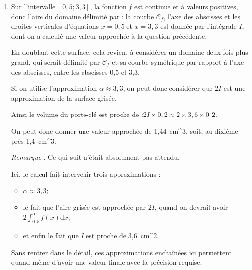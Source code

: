 \documentclass[10pt]{article}
\providecommand{\e}{{\mathrm{e}}}
\providecommand{\np}[2][]{{#2~#1}}
\renewcommand{\d}{{\mathrm{d}}}
\providecommand{\ds}{\displaystyle}
\begin{document}
\begin{enumerate}
		Comme on a :\quad $I= 0,5\e^{2} - 3,3\e^{-3,6}\approx 3,6$\quad au dixième près, on arrive bien à l'arrondi annoncé.

		\item Sur l'intervalle $[0,5 ; 3,3]$, la fonction $f$ est continue et à valeurs positives, donc l'aire du domaine délimité par : la courbe $\mathcal{C}_f$, l'axe des abscisses et les droites verticales d'équations $x = 0,5$ et $x = 3,3$ est donnée par l'intégrale $I$, dont on a calculé une valeur approchée à la question précédente.

		En doublant cette surface, cela revient à considérer un domaine deux fois plus grand, qui serait délimité par $\mathcal{C}_f$ et sa courbe symétrique par rapport à l'axe des abscisses, entre les abscisses 0,5 et 3,3.

		Si on utilise l'approximation $\alpha \approx 3,3$, on peut donc considérer que $2I$ est une approximation de la surface grisée.

		Ainsi le volume du porte-clé est proche de :\quad $2I \times 0,2 \approx 2 \times 3,6 \times 0,2$.

		On peut donc donner une valeur approchée de \np[cm^3]{1,44}, soit, au dixième près \np[cm^3]{1,4}.

		\emph{Remarque :} Ce qui suit n'était absolument pas attendu.

	 Ici, le calcul fait intervenir trois approximations :
	 \begin{itemize}
	 	\item $\alpha \approx 3,3$;
	 	\item le fait que l'aire grisée est approchée par $2I$, quand on devrait avoir \quad $\ds 2\int_{0,5}^{\alpha} f(x) \d x$;
	 	\item et enfin le fait que $I$ est proche de \np[cm^2]{3,6}.
	 \end{itemize}

		Sans rentrer dans le détail, ces approximations enchaînées ici permettent quand même d'avoir une valeur finale avec la précision requise.
	\end{enumerate}
\end{document}
